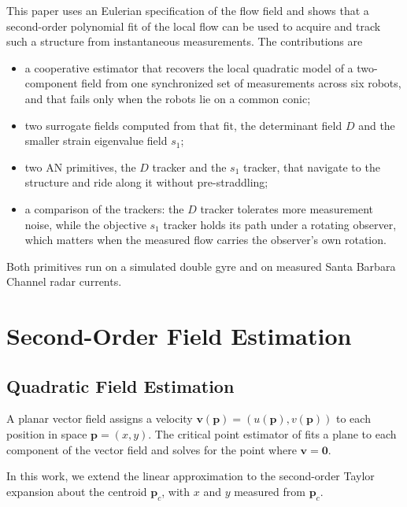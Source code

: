 \documentclass[lettersize,journal]{IEEEtran}
\begin{document}
This paper uses an Eulerian specification of the flow field and shows that a second-order polynomial fit of the local flow can be used to
acquire and track such a structure from instantaneous measurements. 
The contributions are
\begin{itemize}
\item a cooperative estimator that recovers the local quadratic model of
a two-component field from one synchronized set of measurements across six robots, and that fails only when the robots
lie on a common conic;
\item two surrogate fields computed from that fit, the
determinant field $D$ and the smaller strain eigenvalue field
$s_1$;

\item two AN primitives, the $D$ tracker and the $s_1$ tracker, that
navigate to the structure and ride along it without pre-straddling;
\item a comparison of the trackers: the $D$ tracker tolerates more
measurement noise, while the objective $s_1$ tracker holds its
path under a rotating observer, which matters when the measured flow
carries the observer's own rotation.
\end{itemize}

Both primitives run on a simulated double gyre and on measured Santa
Barbara Channel radar currents.

\section{Second-Order Field Estimation}

\subsection{Quadratic Field Estimation}

A planar vector field assigns a velocity $\mathbf{v}(\mathbf{p}) =
(u(\mathbf{p}), v(\mathbf{p}))$ to each position in space $\mathbf{p} = (x, y)$.
The critical point estimator of \cite{10} fits a plane to each
component of the vector field and solves for the point where $\mathbf{v} = \mathbf{0}$. 

In this work, we extend the linear approximation to the second-order Taylor expansion about the
centroid $\mathbf{p}_c$, with $x$ and $y$ measured from $\mathbf{p}_c$.
\end{document}
